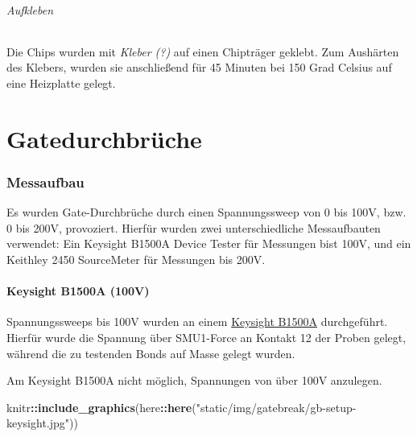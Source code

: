 \documentclass[
  paper=a4,
  ,captions=tableheading
]{scrartcl}
\newenvironment{Shaded}{\begin{snugshade}}{\end{snugshade}}
\newcommand{\KeywordTok}[1]{\textcolor[rgb]{0.13,0.29,0.53}{\textbf{#1}}}
\newcommand{\NormalTok}[1]{#1}
\newcommand{\OperatorTok}[1]{\textcolor[rgb]{0.81,0.36,0.00}{\textbf{#1}}}
\newcommand{\StringTok}[1]{\textcolor[rgb]{0.31,0.60,0.02}{#1}}
\begin{document}
\hypertarget{aufkleben}{%
\paragraph{Aufkleben}\label{aufkleben}}

Die Chips wurden mit \emph{Kleber (?)} auf einen Chipträger geklebt. Zum Aushärten des Klebers, wurden sie anschließend für 45 Minuten bei 150 Grad Celsius auf eine Heizplatte gelegt.

\hypertarget{gatebreak}{%
\part{Gatedurchbrüche}\label{gatebreak}}

\hypertarget{setup}{%
\section{Messaufbau}\label{setup}}

Es wurden Gate-Durchbrüche durch einen Spannungssweep von 0 bis 100V, bzw. 0 bis 200V, provoziert. Hierfür wurden zwei unterschiedliche Messaufbauten verwendet: Ein Keysight B1500A Device Tester für Messungen bist 100V, und ein Keithley 2450 SourceMeter für Messungen bis 200V.

\hypertarget{keysight}{%
\subsection{Keysight B1500A (100V)}\label{keysight}}

Spannungssweeps bis 100V wurden an einem \href{https://www.keysight.com/de/de/products/parameter-device-analyzers-curve-tracer/precision-current-voltage-analyzers/b1500a-semiconductor-device-parameter-analyzer.html}{Keysight B1500A} durchgeführt. Hierfür wurde die Spannung über SMU1-Force an Kontakt 12 der Proben gelegt, während die zu testenden Bonds auf Masse gelegt wurden.

Am Keysight B1500A nicht möglich, Spannungen von über 100V anzulegen.

\begin{Shaded}
\begin{Highlighting}[]
\NormalTok{knitr}\OperatorTok{::}\KeywordTok{include_graphics}\NormalTok{(here}\OperatorTok{::}\KeywordTok{here}\NormalTok{(}\StringTok{"static/img/gatebreak/gb-setup-keysight.jpg"}\NormalTok{))}
\end{Highlighting}
\end{Shaded}
\end{document}
